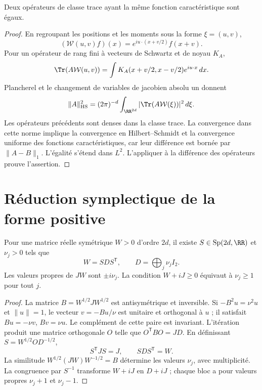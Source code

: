 \begin{lemma}
\label{x_reciprocidad:app:lem:unicidad-weyl}
Deux opérateurs de classe trace ayant la même fonction caractéristique sont égaux.
\end{lemma}
\begin{proof}
En regroupant les positions et les moments sous la forme \(\xi=(u,v)\),
\[
 (\mathcal W(u,v)f)(x)=e^{iu\cdot(x+v/2)}f(x+v).
\]
Pour un opérateur de rang fini à vecteurs de Schwartz et de noyau \(K_A\),
\[
 \Tr(A\mathcal W(u,v))=\int K_A(x+v/2,x-v/2)e^{iu\cdot x}\,dx.
\]
Plancherel et le changement de variables de jacobien absolu un donnent
\[
 \|A\|_{\rm HS}^2=(2\pi)^{-d}\int_{\RR^{2d}}
 |\Tr(A\mathcal W(\xi))|^2\,d\xi.
\]
Les opérateurs précédents sont denses dans la classe trace. La convergence
dans cette norme implique la convergence en Hilbert--Schmidt et la convergence
uniforme des fonctions caractéristiques, car leur différence est
bornée par \(\|A-B\|_1\). L’égalité s’étend dans \(L^2\).
L’appliquer à la différence des opérateurs prouve l’assertion.
\end{proof}

\section{Réduction symplectique de la forme positive}
\begin{theorem}
\label{x_reciprocidad:app:thm:williamson}
Pour une matrice réelle symétrique \(W>0\) d’ordre \(2d\), il existe
\(S\in\operatorname{Sp}(2d,\RR)\) et \(\nu_j>0\) tels que
\[
 W=SDS^{\mathsf T},\qquad D=\bigoplus_j\nu_jI_2.
\]
Les valeurs propres de \(JW\) sont \(\pm i\nu_j\). La condition
\(W+iJ\geq0\) équivaut à \(\nu_j\geq1\) pour tout \(j\).
\end{theorem}
\begin{proof}
La matrice \(B=W^{1/2}JW^{1/2}\) est antisymétrique et inversible.
Si \(-B^2u=\nu^2u\) et \(\|u\|=1\), le vecteur
\(v=-Bu/\nu\) est unitaire et orthogonal à \(u\) ; il satisfait
\(Bu=-\nu v\), \(Bv=\nu u\). Le complément de cette paire est
invariant. L’itération produit une matrice orthogonale \(O\) telle que
\(O^{\mathsf T}BO=JD\). En définissant \(S=W^{1/2}OD^{-1/2}\),
\[
 S^{\mathsf T}JS=J,\qquad SDS^{\mathsf T}=W.
\]
La similitude \(W^{1/2}(JW)W^{-1/2}=B\) détermine les valeurs
\(\nu_j\), avec multiplicité. La congruence par \(S^{-1}\)
transforme \(W+iJ\) en \(D+iJ\) ; chaque bloc a pour valeurs propres
\(\nu_j+1\) et \(\nu_j-1\).
\end{proof}

